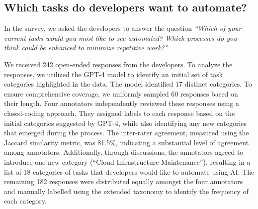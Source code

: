 \subsection{Which tasks do developers want to automate?}

In the survey, we asked the developers to answer the question \textit{``Which of your current tasks would you most like to see automated? Which processes do you think could be enhanced to minimize repetitive work?"} 

We received 242 open-ended responses from the developers. To analyze the responses, we utilized the GPT-4 model to identify an initial set of task categories highlighted in the data. The model identified 17 distinct categories. To ensure comprehensive coverage, we uniformly sampled 60 responses based on their length. Four annotators independently reviewed these responses using a closed-coding approach. 
They assigned labels to each response based on the initial categories suggested by GPT-4, while also identifying any new categories that emerged during the process. 
The inter-rater agreement, measured using the Jaccard similarity metric, was 81.5\%, indicating a substantial level of agreement among annotators. Additionally, through discussions, the annotators agreed to introduce one new category (``Cloud Infrastructure Maintenance''), resulting in a list of 18 categories of tasks that developers would like to automate using AI. 
The remaining 182 responses were distributed equally amongst the four annotators and manually labelled using the extended taxonomy to identify the frequency of each category.

